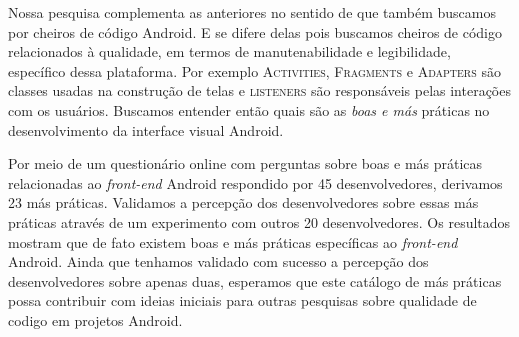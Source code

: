 
Nossa pesquisa complementa as anteriores no sentido de que também buscamos por cheiros de código Android. E se difere delas pois buscamos cheiros de código relacionados à qualidade, em termos de manutenabilidade e legibilidade, específico dessa plataforma. Por exemplo \textsc{Activities}, \textsc{Fragments} e \textsc{Adapters} são classes usadas na construção de telas e \textsc{listeners} são responsáveis pelas interações com os usuários. Buscamos entender então quais são as \emph{boas e más} práticas no desenvolvimento da interface visual Android. 


 

Por meio de um questionário online com perguntas sobre boas e más práticas relacionadas ao \textit{front-end} Android respondido por 45 desenvolvedores, derivamos 23 más práticas. Validamos a percepção dos desenvolvedores sobre essas más práticas através de um experimento com outros 20 desenvolvedores. Os resultados mostram que de fato existem boas e más práticas específicas ao \textit{front-end} Android. Ainda que tenhamos validado com sucesso a percepção dos desenvolvedores sobre apenas duas, esperamos que este catálogo de más práticas possa contribuir com ideias iniciais para outras pesquisas sobre qualidade de codigo em projetos Android.

